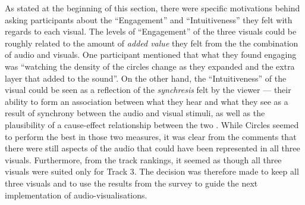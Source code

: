 \documentclass[../initial_thesis.tex]{subfiles}
\begin{document}
As stated at the beginning of this section, there were specific motivations behind asking participants about the ``Engagement'' and ``Intuitiveness'' they felt with regards to each visual. The levels of ``Engagement'' of the three visuals could be roughly related to the amount of \emph{added value} they felt from the the combination of audio and visuals. One participant mentioned that what they found engaging was ``watching the density of the circles change as they expanded and the extra layer that added to the sound''. On the other hand, the ``Intuitiveness'' of the visual could be seen as a reflection of the \emph{synchresis} felt by the viewer --- their ability to form an association between what they hear and what they see as a result of synchrony between the audio and visual stimuli, as well as the plausibility of a cause-effect relationship between the two \cite{Kubovy2010}. While Circles seemed to perform the best in those two measures, it was clear from the comments that there were still aspects of the audio that could have been represented in all three visuals. Furthermore, from the track rankings, it seemed as though all three visuals were suited only for Track 3. The decision was therefore made to keep all three visuals and to use the results from the survey to guide the next implementation of audio-visualisations.
\end{document}
